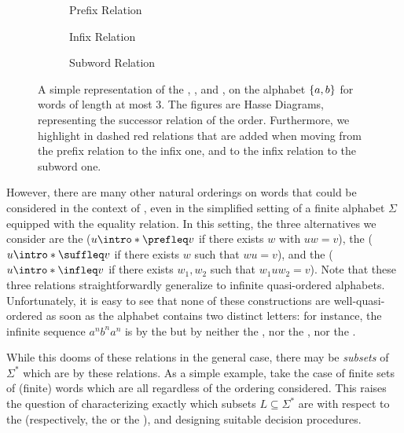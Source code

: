 \begin{figure}
    \centering
    \begin{subfigure}[t]{0.48\textwidth}
    	\centering
    	
    	\caption{Prefix Relation}
   	\end{subfigure}%
   	\hfill%
   	\begin{subfigure}[t]{0.48\textwidth}
   		\centering
   		
   		\caption{Infix Relation}
   	\end{subfigure}
   	\begin{subfigure}[t]{0.48\textwidth}
   		\centering
   		
   		\caption{Subword Relation}
   	\end{subfigure}
   	
   	\caption{A simple representation of the ,
        ,
        and ,
        on the alphabet $\{ a,b \}$ for words of
        length at most $3$. The figures are Hasse Diagrams,
        representing the successor relation of the order.
        Furthermore, we highlight in dashed red relations that are added
        when moving from the prefix relation to the infix one,
        and to the infix relation to the subword one.}
    \label{word-embeddings:fig}
\end{figure}

\AP However, there are many other natural orderings on words that could be
considered in the context of , even in the simplified
setting of a finite alphabet $\Sigma$ equipped with the equality relation. In
this setting, the three alternatives we consider are the  ($u \intro*\prefleq v$ if there exists $w$ with $uw = v$), the
 ($u \intro*\suffleq v$ if there exists $w$ such that
$wu = v$), and the  ($u \intro*\infleq v$ if there exists
$w_1,w_2$ such that $w_1 u w_2 = v$). Note that these three relations
straightforwardly generalize to infinite quasi-ordered alphabets.
Unfortunately, it is easy to see that none of these constructions are 
well-quasi-ordered as soon as the alphabet contains two distinct letters:
for instance, the infinite sequence $a^n b^n a^n$ is  by
the  but by neither the , nor the
, nor the .

\AP While this dooms  of these
relations in the general case, there may be \emph{subsets} of $\Sigma^*$ which
are  by these relations. As a simple example, take the
case of finite sets of (finite) words which are all 
regardless of the ordering considered. This raises the question of
characterizing exactly which subsets $L \subseteq \Sigma^*$ are
 with respect to the  (respectively,
the  or the ), and designing
suitable decision procedures.

